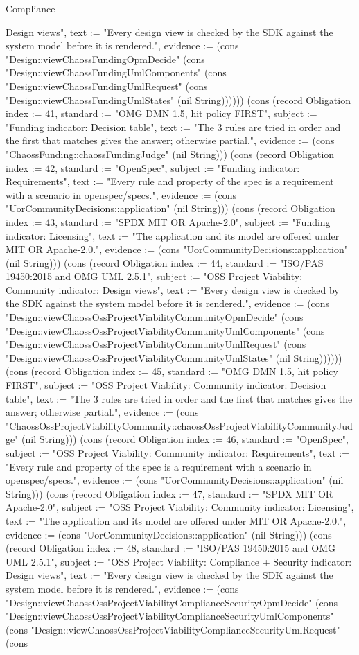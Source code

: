 \begin{lexlean}{Compliance}
\begin{semanticmodule}
{Design views", text := "Every design view is checked by the SDK against the system model before it is rendered.", evidence := (cons "Design::viewChaossFundingOpmDecide" (cons "Design::viewChaossFundingUmlComponents" (cons "Design::viewChaossFundingUmlRequest" (cons "Design::viewChaossFundingUmlStates" (nil String)))))}) (cons (record Obligation {index := 41, standard := "OMG DMN 1.5, hit policy FIRST", subject := "Funding indicator: Decision table", text := "The 3 rules are tried in order and the first that matches gives the answer; otherwise partial.", evidence := (cons "ChaossFunding::chaossFundingJudge" (nil String))}) (cons (record Obligation {index := 42, standard := "OpenSpec", subject := "Funding indicator: Requirements", text := "Every rule and property of the spec is a requirement with a scenario in openspec/specs.", evidence := (cons "UorCommunityDecisions::application" (nil String))}) (cons (record Obligation {index := 43, standard := "SPDX MIT OR Apache-2.0", subject := "Funding indicator: Licensing", text := "The application and its model are offered under MIT OR Apache-2.0.", evidence := (cons "UorCommunityDecisions::application" (nil String))}) (cons (record Obligation {index := 44, standard := "ISO/PAS 19450:2015 and OMG UML 2.5.1", subject := "OSS Project Viability: Community indicator: Design views", text := "Every design view is checked by the SDK against the system model before it is rendered.", evidence := (cons "Design::viewChaossOssProjectViabilityCommunityOpmDecide" (cons "Design::viewChaossOssProjectViabilityCommunityUmlComponents" (cons "Design::viewChaossOssProjectViabilityCommunityUmlRequest" (cons "Design::viewChaossOssProjectViabilityCommunityUmlStates" (nil String)))))}) (cons (record Obligation {index := 45, standard := "OMG DMN 1.5, hit policy FIRST", subject := "OSS Project Viability: Community indicator: Decision table", text := "The 3 rules are tried in order and the first that matches gives the answer; otherwise partial.", evidence := (cons "ChaossOssProjectViabilityCommunity::chaossOssProjectViabilityCommunityJudge" (nil String))}) (cons (record Obligation {index := 46, standard := "OpenSpec", subject := "OSS Project Viability: Community indicator: Requirements", text := "Every rule and property of the spec is a requirement with a scenario in openspec/specs.", evidence := (cons "UorCommunityDecisions::application" (nil String))}) (cons (record Obligation {index := 47, standard := "SPDX MIT OR Apache-2.0", subject := "OSS Project Viability: Community indicator: Licensing", text := "The application and its model are offered under MIT OR Apache-2.0.", evidence := (cons "UorCommunityDecisions::application" (nil String))}) (cons (record Obligation {index := 48, standard := "ISO/PAS 19450:2015 and OMG UML 2.5.1", subject := "OSS Project Viability: Compliance + Security indicator: Design views", text := "Every design view is checked by the SDK against the system model before it is rendered.", evidence := (cons "Design::viewChaossOssProjectViabilityComplianceSecurityOpmDecide" (cons "Design::viewChaossOssProjectViabilityComplianceSecurityUmlComponents" (cons "Design::viewChaossOssProjectViabilityComplianceSecurityUmlRequest" (cons }
\end{semanticmodule}
\end{lexlean}
